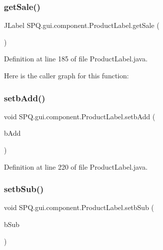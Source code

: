 \subsubsection{\texorpdfstring{get\+Sale()}{getSale()}}
{\footnotesize\ttfamily J\+Label S\+P\+Q.\+gui.\+component.\+Product\+Label.\+get\+Sale (\begin{DoxyParamCaption}{ }\end{DoxyParamCaption})}



Definition at line 185 of file Product\+Label.\+java.

Here is the caller graph for this function\+:
\mbox{\label{class_s_p_q_1_1gui_1_1component_1_1_product_label_ac3981c38ea018be3253d133cd1da8b83}} 
\subsubsection{\texorpdfstring{setb\+Add()}{setbAdd()}}
{\footnotesize\ttfamily void S\+P\+Q.\+gui.\+component.\+Product\+Label.\+setb\+Add (\begin{DoxyParamCaption}\item[{J\+Button}]{b\+Add }\end{DoxyParamCaption})}



Definition at line 220 of file Product\+Label.\+java.

\mbox{\label{class_s_p_q_1_1gui_1_1component_1_1_product_label_a1d3899db7326042feaa04a482a86ee8e}} 
\subsubsection{\texorpdfstring{setb\+Sub()}{setbSub()}}
{\footnotesize\ttfamily void S\+P\+Q.\+gui.\+component.\+Product\+Label.\+setb\+Sub (\begin{DoxyParamCaption}\item[{J\+Button}]{b\+Sub }\end{DoxyParamCaption})}



